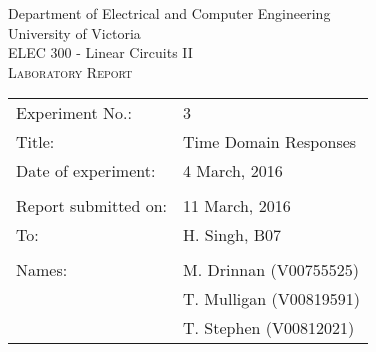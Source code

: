 \begin{center}
	\begin{LARGE}
		Department of Electrical and Computer Engineering \\
		University of Victoria \\
		ELEC 300 - Linear Circuits II \\[1cm]
		\textsc{Laboratory Report}
		\\[1cm]
	\end{LARGE}
\end{center}

\begin{tabular}{ p{} p{} }
	Experiment No.: & 3 \\ 
	Title: & Time Domain Responses \\ 
	Date of experiment:& 4 March, 2016 \\ 
	& \\
	Report submitted on:& 11 March, 2016 \\ 
	To: & H. Singh, B07 \\ 
	& \\
	Names: & M. Drinnan (V00755525)\\
	& T. Mulligan (V00819591) \\
	& T. Stephen (V00812021)  
\end{tabular}

\newpage